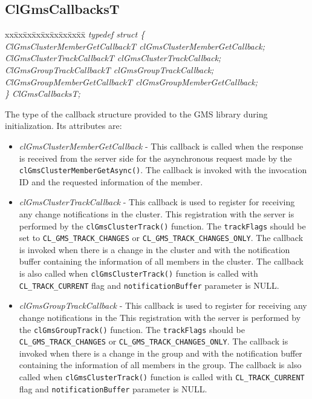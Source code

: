 \begin{flushleft}
\subsection{ClGmsCallbacksT}
\begin{tabbing}
xx\=xx\=xx\=xx\=xx\=xx\=xx\=xx\=xx\=\kill
\textit{typedef struct \{}\\
\>\>\>\>\textit{ClGmsClusterMemberGetCallbackT clGmsClusterMemberGetCallback;}\\
\>\>\>\>\textit{ClGmsClusterTrackCallbackT     clGmsClusterTrackCallback;}\\
\>\>\>\>\textit{ClGmsGroupTrackCallbackT       clGmsGroupTrackCallback;}\\
\>\>\>\>\textit{ClGmsGroupMemberGetCallbackT   clGmsGroupMemberGetCallback;}\\
\textit{\} ClGmsCallbacksT;}\end{tabbing}
The type of the callback structure provided to the GMS library during initialization. Its attributes are:
\begin{itemize}
\item
\textit{clGmsClusterMemberGetCallback} - This callback is called when the response is received from the server side for
 the asynchronous request made by the {\tt{clGmsClusterMemberGetAsync()}}. The callback
 is invoked with the invocation ID and the requested information of the member.
\item
\textit{clGmsClusterTrackCallback} - This callback is used to register for receiving any change notifications in the
 cluster. This registration with the server is performed
 by the {\tt{clGmsClusterTrack()}} function. The {\tt{trackFlags}} should be set to
 {\tt{CL\_\-GMS\_\-TRACK\_\-CHANGES}} or {\tt{CL\_\-GMS\_\-TRACK\_\-CHANGES\_\-ONLY}}. The callback is
 invoked when there is a change in the cluster and with the
 notification buffer containing the information of all members in the
 cluster. The callback is also called when {\tt{clGmsClusterTrack()}} function is
 called with {\tt{CL\_\-TRACK\_\-CURRENT}} flag and {\tt{notificationBuffer}} parameter
 is NULL.
\item
\textit{clGmsGroupTrackCallback} - This callback is used to register for receiving any change notifications in the
  This registration with the server is performed
 by the {\tt{clGmsGroupTrack()}} function. The {\tt{trackFlags}} should be
 {\tt{CL\_\-GMS\_\-TRACK\_\-CHANGES}} or {\tt{CL\_\-GMS\_\-TRACK\_\-CHANGES\_\-ONLY}}. The callback is
 invoked when there is a change in the group and with the
 notification buffer containing the information of all members in the
 group. The callback is also called when {\tt{clGmsClusterTrack()}} function is
 called with {\tt{CL\_\-TRACK\_\-CURRENT}} flag and {\tt{notificationBuffer}} parameter
 is NULL.


\end{itemize}
\end{flushleft}

